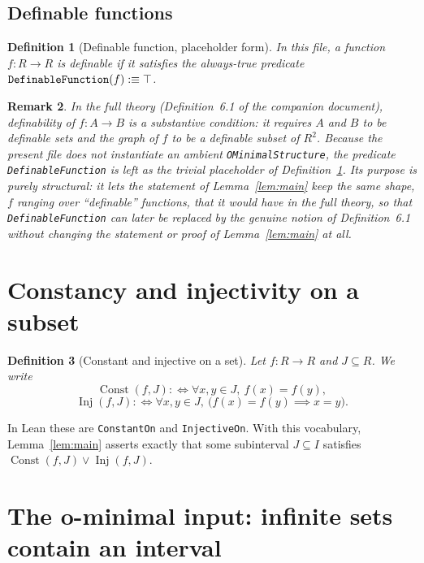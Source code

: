 \documentclass[11pt]{article}
\newtheorem{definition}{Definition}[section]
\newtheorem{remark}[definition]{Remark}
\newcommand{\Lean}[1]{\texttt{\begingroup\def\_{\textunderscore\discretionary{}{}{}}#1\endgroup}}
\newcommand{\Const}{\operatorname{Const}}
\newcommand{\Inj}{\operatorname{Inj}}
\begin{document}
\subsection{Definable functions}
 
\begin{definition}[Definable function, placeholder form]\label{def:definable-fn}
In this file, a function $f:R\to R$ is \emph{definable} if it satisfies the always-true predicate
$\Lean{DefinableFunction}(f) :\equiv \top$.
\end{definition}
 
\begin{remark}
In the full theory (Definition~6.1 of the companion document), definability of $f:A\to B$ is a
substantive condition: it requires $A$ and $B$ to be definable sets and the graph of $f$ to be a
definable subset of $R^{2}$. Because the present file does not instantiate an ambient
\Lean{OMinimalStructure}, the predicate \Lean{DefinableFunction} is left as the trivial placeholder
of Definition~\ref{def:definable-fn}. Its purpose is purely structural: it lets the statement of
Lemma~\ref{lem:main} keep the same shape, $f$ ranging over ``definable'' functions, that it would
have in the full theory, so that \Lean{DefinableFunction} can later be replaced by the genuine
notion of Definition~6.1 without changing the statement or proof of Lemma~\ref{lem:main} at all.
\end{remark}
 
\section{Constancy and injectivity on a subset}
 
\begin{definition}[Constant and injective on a set]
Let $f:R\to R$ and $J\subseteq R$. We write
\[
  \Const(f,J) :\iff \forall x,y\in J,\ f(x)=f(y),
\]
\[
  \Inj(f,J) :\iff \forall x,y\in J,\ \bigl(f(x)=f(y)\implies x=y\bigr).
\]
\end{definition}
 
In Lean these are \Lean{ConstantOn} and \Lean{InjectiveOn}. With this vocabulary,
Lemma~\ref{lem:main} asserts exactly that some subinterval $J\subseteq I$ satisfies
$\Const(f,J)\vee\Inj(f,J)$.
 
\section{The o-minimal input: infinite sets contain an interval}
 
\end{document}
